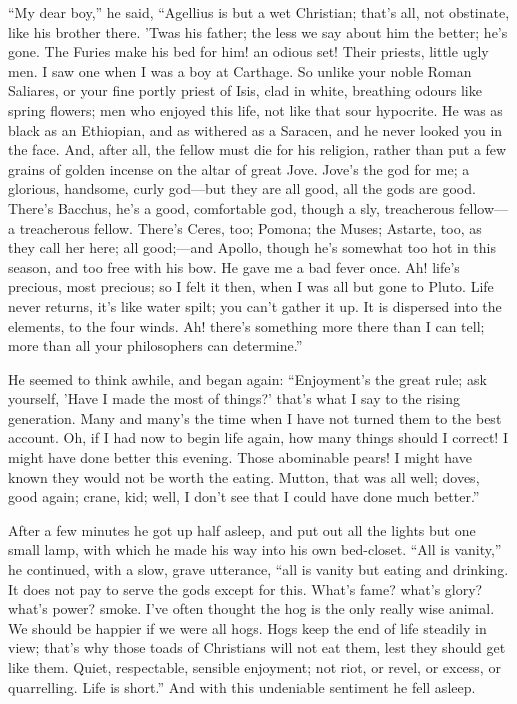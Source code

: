 ``My dear boy,'' he said, ``Agellius is but a wet
Christian; that's all, not obstinate, like his brother there. 'Twas
his father; the less we say about him the better; he's gone. The
Furies make his bed for him! an odious set! Their priests, little ugly
men. I saw one when I was a boy at Carthage. So unlike your noble
Roman Saliares, or your fine portly priest of Isis, clad in white,
breathing odours like spring flowers; men who enjoyed this life, not
like that sour hypocrite. He was as black as an Ethiopian, and as
withered as a Saracen, and he never looked you in the face. And, after
all, the fellow must die for his religion, rather than put a few
grains of golden incense on the altar of great Jove. Jove's the god
for me; a glorious, handsome, curly god—but they are all good, all
the gods are good. There's Bacchus, he's a good, comfortable god,
though a sly, treacherous fellow—a treacherous fellow. There's
Ceres, too; Pomona; the Muses; Astarte, too, as they call her
here; all good;—and Apollo, though he's somewhat too hot in this
season, and too free with his bow. He gave me a bad fever once. Ah!
life's precious, most precious; so I felt it then, when I was all but
gone to Pluto. Life never returns, it's like water spilt; you can't
gather it up. It is dispersed into the elements, to the four winds.
Ah! there's something more there than I can tell; more than all your
philosophers can determine.''

He seemed to think awhile, and began again: ``Enjoyment's the
great rule; ask yourself, 'Have I made the most of things?' that's
what I say to the rising generation. Many and many's the time when I
have not turned them to the best account. Oh, if I had now to begin
life again, how many things should I correct! I might have done better
this evening. Those abominable pears! I might have known they would
not be worth the eating. Mutton, that was all well; doves, good again;
crane, kid; well, I don't see that I could have done much
better.''

After a few minutes he got up half asleep, and put out all the
lights but one small lamp, with which he made his way into his own
bed-closet. ``All is vanity,'' he continued, with a slow,
grave utterance, ``all is vanity but eating and drinking. It does
not pay to serve the gods except for this. What's fame? what's glory?
what's power? smoke. I've often thought the hog is the only really
wise animal. We should be happier if we were all hogs. Hogs keep the
end of life steadily in view; that's why those toads of
Christians will not eat them, lest they should get like them. Quiet,
respectable, sensible enjoyment; not riot, or revel, or excess, or
quarrelling. Life is short.'' And with this undeniable sentiment
he fell asleep.

